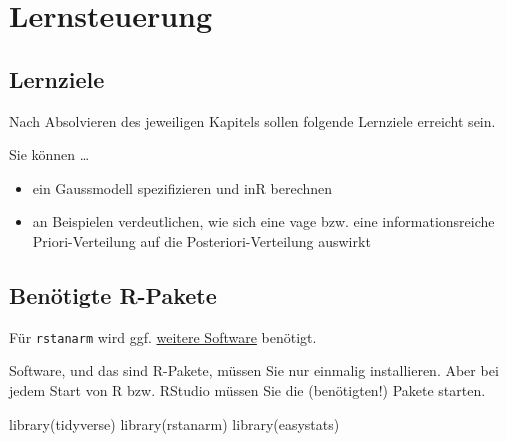 \documentclass[
  a4paper,
  DIV=11]{scrreprt}
\newenvironment{Shaded}{\begin{snugshade}}{\end{snugshade}}
\newcommand{\FunctionTok}[1]{\textcolor[rgb]{0.28,0.35,0.67}{#1}}
\newcommand{\NormalTok}[1]{\textcolor[rgb]{0.00,0.23,0.31}{#1}}
\providecommand{\tightlist}{%
  \setlength{\itemsep}{0pt}\setlength{\parskip}{0pt}}\usepackage{longtable,booktabs,array}
\theoremstyle{definition}
\theoremstyle{remark}
\begin{document}
\hypertarget{lernsteuerung-6}{%
\section{Lernsteuerung}\label{lernsteuerung-6}}

\hypertarget{lernziele-7}{%
\subsection{Lernziele}\label{lernziele-7}}

Nach Absolvieren des jeweiligen Kapitels sollen folgende Lernziele
erreicht sein.

Sie können \ldots{}

\begin{itemize}
\tightlist
\item
  ein Gaussmodell spezifizieren und inR berechnen
\item
  an Beispielen verdeutlichen, wie sich eine vage bzw. eine
  informationsreiche Priori-Verteilung auf die Posteriori-Verteilung
  auswirkt
\end{itemize}

\hypertarget{benuxf6tigte-r-pakete-4}{%
\subsection{Benötigte R-Pakete}\label{benuxf6tigte-r-pakete-4}}

Für \texttt{rstanarm} wird ggf.
\href{https://github.com/stan-dev/rstan/wiki/RStan-Getting-Started}{weitere
Software} benötigt.

\begin{tcolorbox}[enhanced jigsaw, leftrule=.75mm, toptitle=1mm, bottomtitle=1mm, titlerule=0mm, breakable, colframe=quarto-callout-note-color-frame, title=\textcolor{quarto-callout-note-color}{\faInfo}\hspace{0.5em}{Hinweis}, rightrule=.15mm, colback=white, arc=.35mm, left=2mm, bottomrule=.15mm, coltitle=black, opacitybacktitle=0.6, toprule=.15mm, colbacktitle=quarto-callout-note-color!10!white, opacityback=0]
Software, und das sind R-Pakete, müssen Sie nur einmalig installieren.
Aber bei jedem Start von R bzw. RStudio müssen Sie die (benötigten!)
Pakete starten.
\end{tcolorbox}

\begin{Shaded}
\begin{Highlighting}[]
\FunctionTok{library}\NormalTok{(tidyverse)}
\FunctionTok{library}\NormalTok{(rstanarm)}
\FunctionTok{library}\NormalTok{(easystats)}
\end{Highlighting}
\end{Shaded}
\end{document}
